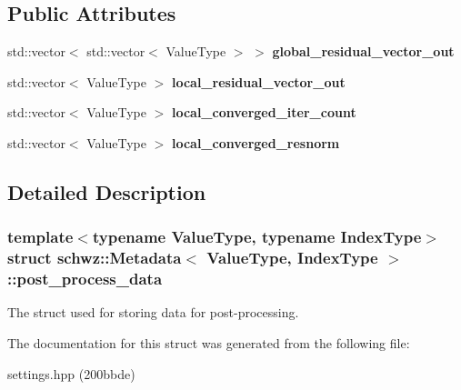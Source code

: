 \subsection*{Public Attributes}
\begin{DoxyCompactItemize}
\item 
\mbox{\label{structschwz_1_1Metadata_1_1post__process__data_a3cd4dc39548794213196924e925947e4}} 
std\+::vector$<$ std\+::vector$<$ Value\+Type $>$ $>$ {\bfseries global\+\_\+residual\+\_\+vector\+\_\+out}
\item 
\mbox{\label{structschwz_1_1Metadata_1_1post__process__data_ac508dd9baaf55fe3eefaac84a081ea07}} 
std\+::vector$<$ Value\+Type $>$ {\bfseries local\+\_\+residual\+\_\+vector\+\_\+out}
\item 
\mbox{\label{structschwz_1_1Metadata_1_1post__process__data_ae089ea8c22e004373eb6f53c2db01383}} 
std\+::vector$<$ Value\+Type $>$ {\bfseries local\+\_\+converged\+\_\+iter\+\_\+count}
\item 
\mbox{\label{structschwz_1_1Metadata_1_1post__process__data_af03f16caf28849a9b1946c52d7d628fb}} 
std\+::vector$<$ Value\+Type $>$ {\bfseries local\+\_\+converged\+\_\+resnorm}
\end{DoxyCompactItemize}


\subsection{Detailed Description}
\subsubsection*{template$<$typename Value\+Type, typename Index\+Type$>$\newline
struct schwz\+::\+Metadata$<$ Value\+Type, Index\+Type $>$\+::post\+\_\+process\+\_\+data}

The struct used for storing data for post-\/processing. 

The documentation for this struct was generated from the following file\+:\begin{DoxyCompactItemize}
\item 
settings.\+hpp (200bbde)\end{DoxyCompactItemize}
